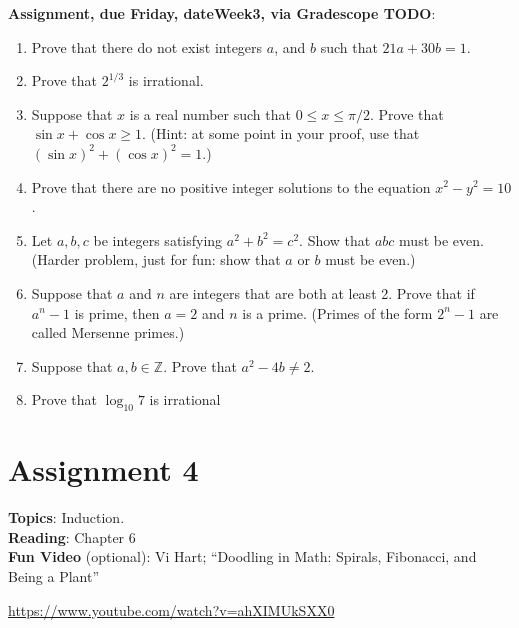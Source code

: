 \documentclass[12pt]{article}
\begin{document}
\noindent \textbf{Assignment, due Friday, \csname dateWeek3\endcsname, via Gradescope TODO}:
\begin{enumerate}
\item Prove that there do not exist integers $a$, and $b$ such that $21a + 30b = 1$.
\item Prove that $2^{1/3}$ is irrational.
\item Suppose that $x$ is a real number such that $0 \leq x \leq \pi/2$. Prove that $\sin x + \cos x \geq 1$. (Hint: at some point in your proof, use that $(\sin x)^2 + (\cos x)^2 = 1$.)
\item Prove that there are no positive integer solutions to the equation $x^2 - y^2 = 10$.
\item Let $a, b, c$ be integers satisfying $a^2 + b^2 = c^2$. Show that $abc$ must be even. (Harder problem, just for fun: show that $a$ or $b$ must be even.)
\item Suppose that $a$ and $n$ are integers that are both at least 2. Prove that if $a^n -1$ is prime, then $a = 2$ and $n$ is a prime. (Primes of the form $2^n - 1$ are called Mersenne primes.)
\item Suppose that $a,b \in \mathbb{Z}$. Prove that $a^2 - 4b \neq 2$.

\item Prove that $\log_{10} 7$ is irrational
\end{enumerate}


\newpage
\section[4 (due \csname dateWeek4\endcsname): Induction.]{Assignment 4}

\textbf{Topics}: Induction.
\\

\noindent \textbf{Reading}: Chapter 6
\\

\noindent \textbf{Fun Video} (optional): Vi Hart; ``Doodling in Math: Spirals, Fibonacci, and Being a Plant''

\noindent \url{https://www.youtube.com/watch?v=ahXIMUkSXX0}
\\ 
\end{document}
